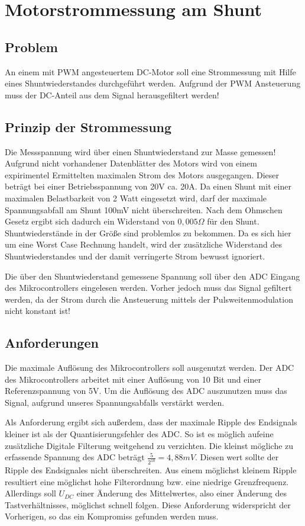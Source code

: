 
\chapter{Motorstrommessung am Shunt}


\section{Problem}

An einem mit PWM angesteuertem DC-Motor soll eine Strommessung mit Hilfe eines Shuntwiederstandes
durchgeführt werden. Aufgrund der PWM Ansteuerung muss der DC-Anteil aus dem Signal herausgefiltert werden!


\section{Prinzip der Strommessung}

Die Messspannung wird über einen Shuntwiederstand zur Masse gemessen! Aufgrund nicht vorhandener Datenblätter des Motors
wird von einem expirimentel Ermittelten maximalen Strom des Motors ausgegangen. Dieser beträgt bei einer Betriebsspannung von 20V ca. 20A.
Da einen Shunt mit einer maximalen Belastbarkeit von 2 Watt eingesetzt wird, darf der maximale Spannungsabfall am Shunt 100mV nicht überschreiten.
Nach dem Ohmschen Gesetz ergibt sich dadurch ein Widerstand von $0,005 \Omega$  für den Shunt. Shuntwiederstände in der Größe sind problemlos zu bekommen.
Da es sich hier um eine Worst Case Rechnung handelt, wird der zusätzliche Widerstand des Shuntwiederstandes und der damit verringerte Strom bewusst ignoriert.

Die über den Shuntwiederstand gemessene Spannung soll über den ADC Eingang des Mikrocontrollers eingelesen werden. Vorher jedoch muss das Signal gefiltert werden, da der Strom
durch die Ansteuerung mittels der Pulsweitenmodulation nicht konstant ist!



\section{Anforderungen}
Die maximale Auflösung des Mikrocontrollers soll ausgenutzt werden. Der ADC des Mikrocontrollers arbeitet mit einer Auflösung von 10 Bit und einer 
Referenzspannung von 5V. Um die Auflösung des ADC auszunutzen muss das Signal, aufgrund unseres Spannungsabfalls verstärkt werden.

Als Anforderung ergibt sich außerdem, dass der maximale Ripple des Endsignals kleiner ist als der Quantisierungsfehler des ADC.
So ist es möglich aufeine zusätzliche Digitale Filterung weitgehend zu verzichten.
Die kleinst mögliche zu erfassende Spannung des ADC beträgt $\frac{5}{2^{10}}=4,88mV$.
Diesen wert sollte der Ripple des Endsignales nicht überschreiten.
Aus einem möglichst kleinem Ripple resultiert eine möglichst hohe Filterordnung bzw. eine niedrige Grenzfrequenz.
Allerdings soll $U_{DC}$ einer Änderung des Mittelwertes, also einer Änderung des Tastverhältnisses, möglichst
schnell folgen. Diese Anforderung widerspricht der Vorherigen, so das ein Kompromiss gefunden werden muss.

